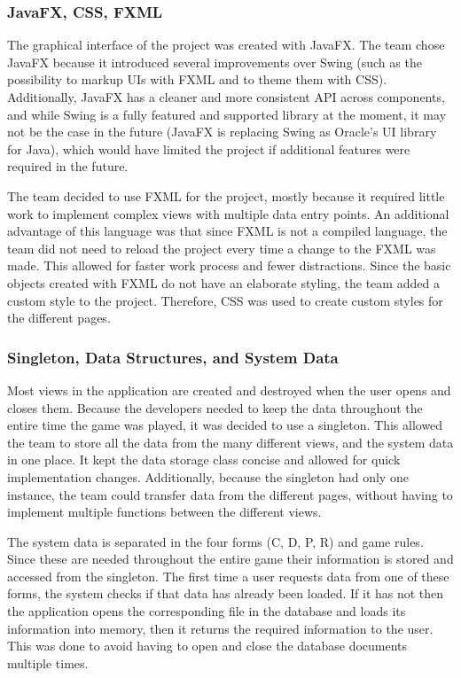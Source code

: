 \documentclass{l3proj}
\begin{document}
\subsubsection{JavaFX, CSS, FXML}
The graphical interface of the project was created with JavaFX. The team chose JavaFX because it introduced several improvements over Swing (such as the possibility to markup UIs with FXML and to theme them with CSS). Additionally, JavaFX has a cleaner and more consistent API across components, and while Swing is a fully featured and supported library at the moment, it may not be the case in the future (JavaFX is replacing Swing as Oracle's UI library for Java), which would have limited the project if additional features were required in the future.

The team decided to use FXML for the project, mostly because it required little work to implement complex views with multiple data entry points. An additional advantage of this language was that since FXML is not a compiled language, the team did not need to reload the project every time a change to the FXML was made. This allowed for faster work process and fewer distractions. Since the basic objects created with FXML do not have an elaborate styling, the team added a custom style to the project. Therefore, CSS was used to create custom styles for the different pages.

\subsubsection{Singleton, Data Structures, and System Data}
Most views in the application are created and destroyed when the user opens and closes them. Because the developers needed to keep the data throughout the entire time the game was played, it was decided to use a singleton. This allowed the team to store all the data from the many different views, and the system data in one place. It kept the data storage class concise and allowed for quick implementation changes. Additionally, because the singleton had only one instance, the team could transfer data from the different pages, without having to implement multiple functions between the different views.
 
The system data is separated in the four forms (C, D, P, R) and game rules. Since these are needed throughout the entire game their information is stored and accessed from the singleton. The first time a user requests data from one of these forms, the system checks if that data has already been loaded. If it has not then the application opens the corresponding file in the database and loads its information into memory, then it returns the required information to the user. This was done to avoid having to open and close the database documents multiple times.
\end{document}
